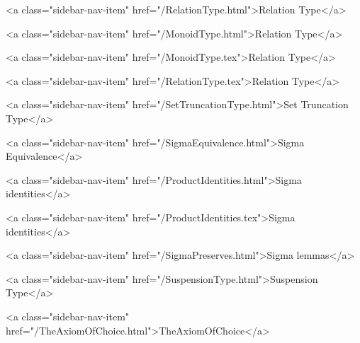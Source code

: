       
    
      
        
          <a class="sidebar-nav-item" href="/RelationType.html">Relation Type</a>
        
      
    
      
        
          <a class="sidebar-nav-item" href="/MonoidType.html">Relation Type</a>
        
      
    
      
        
          <a class="sidebar-nav-item" href="/MonoidType.tex">Relation Type</a>
        
      
    
      
        
          <a class="sidebar-nav-item" href="/RelationType.tex">Relation Type</a>
        
      
    
      
        
          <a class="sidebar-nav-item" href="/SetTruncationType.html">Set Truncation Type</a>
        
      
    
      
        
          <a class="sidebar-nav-item" href="/SigmaEquivalence.html">Sigma Equivalence</a>
        
      
    
      
        
          <a class="sidebar-nav-item" href="/ProductIdentities.html">Sigma identities</a>
        
      
    
      
        
          <a class="sidebar-nav-item" href="/ProductIdentities.tex">Sigma identities</a>
        
      
    
      
        
          <a class="sidebar-nav-item" href="/SigmaPreserves.html">Sigma lemmas</a>
        
      
    
      
        
          <a class="sidebar-nav-item" href="/SuspensionType.html">Suspension Type</a>
        
      
    
      
        
          <a class="sidebar-nav-item" href="/TheAxiomOfChoice.html">TheAxiomOfChoice</a>
        
